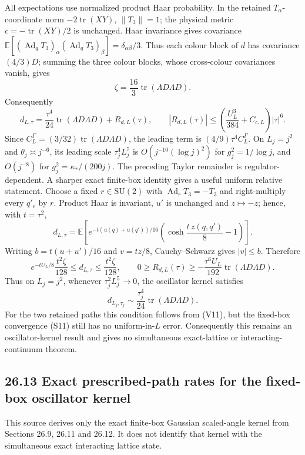 \documentclass[
  11pt,
]{article}
\begin{document}
All expectations use normalized product Haar probability. In the
retained \(T_\alpha\)-coordinate norm \(-2\operatorname{tr}(XY)\),
\(\|T_3\|=1\); the physical metric \(c=-\operatorname{tr}(XY)/2\) is
unchanged. Haar invariance gives covariance
\(\mathbb E[(\operatorname{Ad}_qT_3)_\alpha(\operatorname{Ad}_qT_3)_\beta]=\delta_{\alpha\beta}/3\).
Thus each colour block of \(d\) has covariance \((4/3)D\); summing the
three colour blocks, whose cross-colour covariances vanish, gives \[
\zeta=\frac{16}{3}\operatorname{tr}(\Lambda D\Lambda D).
\] Consequently \[
\boxed{d_{L,\tau}=\frac{\tau^4}{24}\operatorname{tr}(\Lambda D\Lambda D)+R_{d,L}(\tau)},
\qquad |R_{d,L}(\tau)|\le\left(\frac{U_L^3}{384}+C_{c,L}\right)|\tau|^6.
\] Since \(C_L^\Gamma=(3/32)\operatorname{tr}(\Lambda D\Lambda D)\), the
leading term is \((4/9)\tau^4C_L^\Gamma\). On \(L_j=j^2\) and
\(\theta_j\asymp j^{-6}\), its leading scale \(\tau_j^4L_j^7\) is
\(O(j^{-10}(\log j)^2)\) for \(g_j^2=1/\log j\), and \(O(j^{-8})\) for
\(g_j^2=\kappa_*/(200j)\). The preceding Taylor remainder is
regulator-dependent. A sharper exact finite-box identity gives a useful
uniform relative statement. Choose a fixed \(r\in\mathrm{SU}(2)\) with
\(\operatorname{Ad}_rT_3=-T_3\) and right-multiply every \(q'_e\) by
\(r\). Product Haar is invariant, \(u'\) is unchanged and
\(z\mapsto-z\); hence, with \(t=\tau^2\), \[
 d_{L,\tau}=\mathbb E\!\left[e^{-t(u(q)+u(q'))/16}
 \left(\cosh\!\frac{t\,z(q,q')}{8}-1\right)\right].
\] Writing \(b=t(u+u')/16\) and \(v=tz/8\), Cauchy--Schwarz gives
\(|v|\le b\). Therefore \[
 e^{-tU_L/8}\frac{t^2\zeta}{128}
 \le d_{L,\tau}\le\frac{t^2\zeta}{128},
 \qquad
 0\ge R_{d,L}(\tau)\ge
 -\frac{\tau^6U_L}{192}\operatorname{tr}(\Lambda D\Lambda D).
\] Thus on \(L_j=j^2\), whenever \(\tau_j^2L_j^5\to0\), the oscillator
kernel satisfies \[
 d_{L_j,\tau_j}\sim\frac{\tau_j^4}{24}
 \operatorname{tr}(\Lambda D\Lambda D).
\] For the two retained paths this condition follows from (V11), but the
fixed-box convergence (S11) still has no uniform-in-\(L\) error.
Consequently this remains an oscillator-kernel result and gives no
simultaneous exact-lattice or interacting-continuum theorem.

\subsection{26.13 Exact prescribed-path rates for the fixed-box
oscillator
kernel}\label{exact-prescribed-path-rates-for-the-fixed-box-oscillator-kernel}

This source derives only the exact finite-box Gaussian scaled-angle
kernel from Sections 26.9, 26.11 and 26.12. It does not identify that
kernel with the simultaneous exact interacting lattice state.
\end{document}
